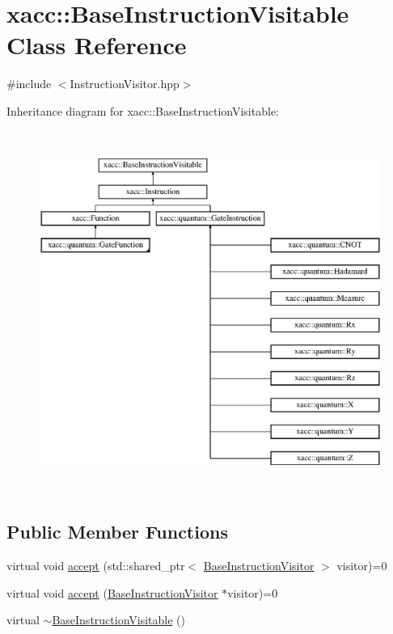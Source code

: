 \hypertarget{a00043}{}\section{xacc\+:\+:Base\+Instruction\+Visitable Class Reference}
\label{a00043}


{\ttfamily \#include $<$Instruction\+Visitor.\+hpp$>$}

Inheritance diagram for xacc\+:\+:Base\+Instruction\+Visitable\+:\begin{figure}[H]
\begin{center}
\leavevmode
\includegraphics[height=11.851852cm]{a00043}
\end{center}
\end{figure}
\subsection*{Public Member Functions}
\begin{DoxyCompactItemize}
\item 
virtual void \hyperlink{a00043_a4ae295a7f83d57c6f1f912adc90274ea}{accept} (std\+::shared\+\_\+ptr$<$ \hyperlink{a00044}{Base\+Instruction\+Visitor} $>$ visitor)=0
\item 
virtual void \hyperlink{a00043_ad6b9ad95c14580cc86ca87cd464262c3}{accept} (\hyperlink{a00044}{Base\+Instruction\+Visitor} $\ast$visitor)=0
\item 
virtual \hyperlink{a00043_a3a291d247b18ea7620dd8d97dfb595f4}{$\sim$\+Base\+Instruction\+Visitable} ()
\end{DoxyCompactItemize}
